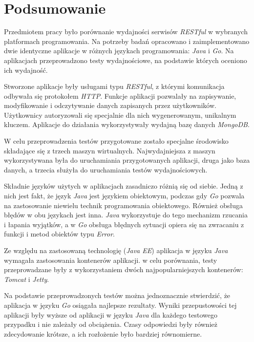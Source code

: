 \chapter{Podsumowanie}

Przedmiotem pracy było porównanie wydajności serwisów \textsl{RESTful} w wybranych platformach programowania. Na potrzeby badań opracowano i zaimplementowano dwie identyczne aplikacje w różnych językach programowania: \textsl{Java} i \textsl{Go}. Na aplikacjach przeprowadzono testy wydajnościowe, na podstawie których oceniono ich wydajność.

Stworzone aplikacje były usługami typu \textsl{RESTful}, z którymi komunikacja odbywała się protokołem \textsl{HTTP}. Funkcje aplikacji pozwalały na zapisywanie, modyfikowanie i odczytywanie danych  zapisanych przez użytkowników. Użytkownicy autoryzowali się specjalnie dla nich wygenerowanym, unikalnym kluczem. Aplikacje do działania wykorzystywały wydajną bazę danych \textsl{MongoDB}.

W celu przeprowadzenia testów przygotowane zostało specjalne środowisko składające się z trzech maszyn wirtualnych. Najwydajniejsza z maszyn wykorzystywana była do uruchamiania przygotowanych aplikacji, druga jako baza danych, a  trzecia  służyła do uruchamiania testów wydajnościowych.

Składnie języków użytych w aplikacjach zasadniczo różnią się od siebie. Jedną z nich jest fakt, że język \textsl{Java} jest językiem obiektowym, podczas gdy \textsl{Go} pozwala na zastosowanie niewielu technik programowania obiektowego. Również obsługa błędów w obu językach jest inna. \textsl{Java} wykorzystuje do tego mechanizm rzucania i łapania wyjątków, a w \textsl{Go} obsługa błędnych sytuacji opiera się na zwracaniu z funkcji i metod obiektów typu \textsl{Error}.

Ze względu na zastosowaną technologię (\textsl{Java EE}) aplikacja w języku \textsl{Java} wymagała zastosowania kontenerów aplikacji. w  celu porównania, testy przeprowadzane były z wykorzystaniem dwóch najpopularniejszych kontenerów: \textsl{Tomcat} i \textsl{Jetty}. 
 
Na podstawie  przeprowadzonych testów można jednoznacznie stwierdzić, że aplikacja w języku \textsl{Go} osiągała najlepsze rezultaty. Wyniki przepustowości tej aplikacji były wyższe od aplikacji w języku \textsl{Java} dla każdego  testowego przypadku i nie zależały od obciążenia.  Czasy odpowiedzi były również zdecydowanie krótsze, a ich rozłożenie było bardziej równomierne.    

